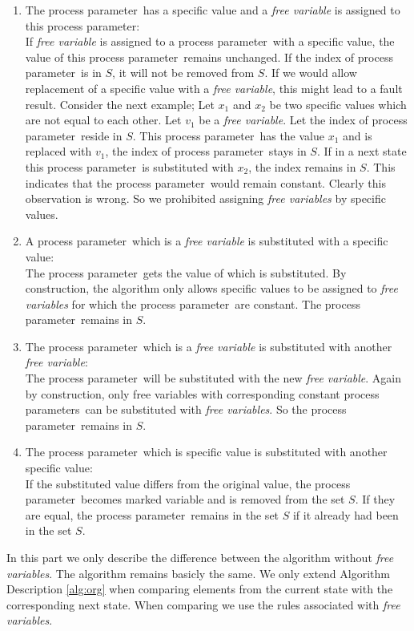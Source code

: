 \index{}\documentclass[a4paper,10pt]{article}
\theoremstyle{plain}
\theoremstyle{definition}
\newcommand{\pp}{process parameter}
\newcommand{\pps}{process parameters}
\newcommand{\ti}{\textit}
\begin{document}
\begin{enumerate}
\item The \pp\ has a specific value and a \ti{free variable} is assigned to this \pp :\\
If \ti{free variable} is assigned to a \pp\ with a specific value, the value of this \pp\ remains unchanged. If the index of \pp\ is in $S$, it will not be removed from $S$. If we would allow replacement of a specific value with a \ti{free variable}, this might lead to a fault result. Consider the next example; Let $x_1$ and $x_2$ be two specific values which are not equal to each other. Let $v_1$ be a \ti{free variable}. Let the index of \pp\ reside in $S$. This \pp\ has the value $x_1$ and is replaced with $v_1$, the index of \pp\ stays in $S$. If in a next state this \pp\ is substituted with $x_2$, the index remains in $S$. This indicates that the \pp\ would remain constant. Clearly this observation is wrong. So we prohibited assigning \ti{free variables} by specific values.

\item A \pp\ which is a \ti{free variable} is substituted with a specific value:\\
The \pp\ gets the value of which is substituted. By construction, the algorithm only allows specific values to be assigned to \ti{free variables} for which the \pp\ are constant. The \pp\ remains in $S$.

\item The \pp\ which is a \ti{free variable} is substituted with another \ti{free variable}:\\
The \pp\ will be substituted with the new \ti{free variable}. Again by construction, only free variables with corresponding constant \pps\ can be substituted with \ti{free variables}. So the \pp\ remains in $S$.

\item The \pp\ which is specific value is substituted with another specific value:\\
If the substituted value differs from the original value, the \pp\ becomes marked variable and is removed from the set $S$.
If they are equal, the \pp\ remains in the set $S$ if it already had been in the set $S$.
\end{enumerate}

In this part we only describe the difference between the algorithm without \ti{free variables}. The algorithm remains basicly the same. We only extend Algorithm Description \ref{alg:org} when comparing elements from the current state with the corresponding next state. When comparing we use the rules associated with \ti{free variables}.
\end{document}
